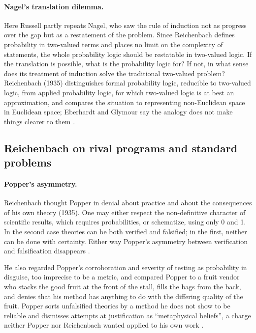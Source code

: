\paragraph{Nagel's translation dilemma.} Here Russell partly repeats
Nagel, who saw the rule of induction not as progress over the gap but as
a restatement of the problem. Since Reichenbach defines probability in
two-valued terms and places no limit on the complexity of statements,
the whole probability logic should be restatable in two-valued logic. If
the translation is possible, what is the probability logic for? If not,
in what sense does its treatment of induction solve the traditional
two-valued problem? Reichenbach (1935) distinguishes formal probability
logic, reducible to two-valued logic, from applied probability logic, for
which two-valued logic is at best an approximation, and compares the
situation to representing non-Euclidean space in Euclidean space; Eberhardt and Glymour say the analogy does not make things clearer to them
\cite[p.~382]{EberhardtGlymour2011ReichenbachReading}.

\subsection{Reichenbach on rival programs and standard problems}
\label{sec:p15-w02b-p15-030-eg-rivals}

\paragraph{Popper's asymmetry.} Reichenbach thought Popper in denial
about practice and about the consequences of his own theory (1935). One
may either respect the non-definitive character of scientific results,
which requires probabilities, or schematize, using only 0 and 1. In the
second case theories can be both verified and falsified; in the first,
neither can be done with certainty. Either way Popper's asymmetry between
verification and falsification disappears
\cite[p.~382]{EberhardtGlymour2011ReichenbachReading}.

He also regarded Popper's corroboration and severity of testing as
probability in disguise, too imprecise to be a metric, and compared
Popper to a fruit vendor who stacks the good fruit at the front of the
stall, fills the bags from the back, and denies that his method has
anything to do with the differing quality of the fruit. Popper sorts
unfalsified theories by a method he does not show to be reliable and
dismisses attempts at justification as ``metaphysical beliefs'', a charge
neither Popper nor Reichenbach wanted applied to his own work
\cite[p.~383]{EberhardtGlymour2011ReichenbachReading}.

